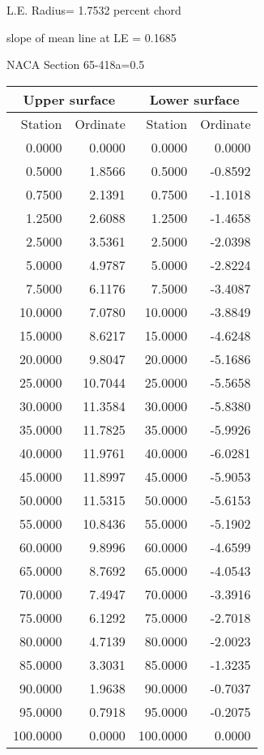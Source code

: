 \documentclass[11pt]{book}
\begin{document}
L.E. Radius=  1.7532 percent chord


 slope of mean line at LE =  0.1685
 \newpage
  \label{s65-418a=0.5}
 \begin{Large}
 NACA Section 65-418a=0.5
 \end{Large}
  
 \vspace{8mm}
 \begin{tabular}{|r|r|r|r|} \hline 
 \multicolumn{2}{|c|}{Upper surface} & \multicolumn{2}{|c|}{Lower surface} \\
 \hline
 Station & Ordinate & Station & Ordinate \\
 \hline
0.0000 & 0.0000 & 0.0000 & 0.0000 \\
0.5000 & 1.8566 & 0.5000 & -0.8592 \\
0.7500 & 2.1391 & 0.7500 & -1.1018 \\
1.2500 & 2.6088 & 1.2500 & -1.4658 \\
2.5000 & 3.5361 & 2.5000 & -2.0398 \\
5.0000 & 4.9787 & 5.0000 & -2.8224 \\
7.5000 & 6.1176 & 7.5000 & -3.4087 \\
10.0000 & 7.0780 & 10.0000 & -3.8849 \\
15.0000 & 8.6217 & 15.0000 & -4.6248 \\
20.0000 & 9.8047 & 20.0000 & -5.1686 \\
25.0000 & 10.7044 & 25.0000 & -5.5658 \\
30.0000 & 11.3584 & 30.0000 & -5.8380 \\
35.0000 & 11.7825 & 35.0000 & -5.9926 \\
40.0000 & 11.9761 & 40.0000 & -6.0281 \\
45.0000 & 11.8997 & 45.0000 & -5.9053 \\
50.0000 & 11.5315 & 50.0000 & -5.6153 \\
55.0000 & 10.8436 & 55.0000 & -5.1902 \\
60.0000 & 9.8996 & 60.0000 & -4.6599 \\
65.0000 & 8.7692 & 65.0000 & -4.0543 \\
70.0000 & 7.4947 & 70.0000 & -3.3916 \\
75.0000 & 6.1292 & 75.0000 & -2.7018 \\
80.0000 & 4.7139 & 80.0000 & -2.0023 \\
85.0000 & 3.3031 & 85.0000 & -1.3235 \\
90.0000 & 1.9638 & 90.0000 & -0.7037 \\
95.0000 & 0.7918 & 95.0000 & -0.2075 \\
100.0000 & 0.0000 & 100.0000 & 0.0000 \\
 \hline 
 \end{tabular}
\end{document}
